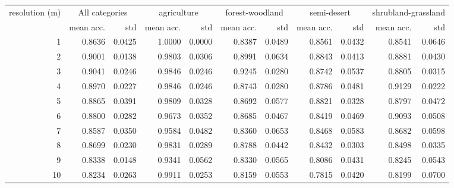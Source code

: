 \begin{tabular}{rrrrrrrrrrr}
\toprule
resolution (m) & \multicolumn{2}{c}{All categories} & \multicolumn{2}{c}{agriculture} & \multicolumn{2}{c}{forest-woodland} & \multicolumn{2}{c}{semi-desert} & \multicolumn{2}{c}{shrubland-grassland} \\
           &     mean acc. &    std &                 mean acc. &    std &                     mean acc. &    std &                 mean acc. &    std &                         mean acc. &    std \\
\midrule
         1 &   0.8636 & 0.0425 &               1.0000 & 0.0000 &                   0.8387 & 0.0489 &               0.8561 & 0.0432 &                       0.8541 & 0.0646 \\
         2 &   0.9001 & 0.0138 &               0.9803 & 0.0306 &                   0.8991 & 0.0634 &               0.8843 & 0.0413 &                       0.8881 & 0.0430 \\
         3 &   0.9041 & 0.0246 &               0.9846 & 0.0246 &                   0.9245 & 0.0280 &               0.8742 & 0.0537 &                       0.8805 & 0.0315 \\
         4 &   0.8970 & 0.0227 &               0.9846 & 0.0246 &                   0.8743 & 0.0280 &               0.8786 & 0.0481 &                       0.9129 & 0.0222 \\
         5 &   0.8865 & 0.0391 &               0.9809 & 0.0328 &                   0.8692 & 0.0577 &               0.8821 & 0.0328 &                       0.8797 & 0.0472 \\
         6 &   0.8800 & 0.0282 &               0.9673 & 0.0352 &                   0.8685 & 0.0467 &               0.8419 & 0.0469 &                       0.9093 & 0.0508 \\
         7 &   0.8587 & 0.0350 &               0.9584 & 0.0482 &                   0.8360 & 0.0653 &               0.8468 & 0.0583 &                       0.8682 & 0.0598 \\
         8 &   0.8699 & 0.0230 &               0.9831 & 0.0289 &                   0.8788 & 0.0442 &               0.8432 & 0.0303 &                       0.8498 & 0.0335 \\
         9 &   0.8338 & 0.0148 &               0.9341 & 0.0562 &                   0.8330 & 0.0565 &               0.8086 & 0.0431 &                       0.8245 & 0.0543 \\
        10 &   0.8234 & 0.0263 &               0.9911 & 0.0253 &                   0.8159 & 0.0553 &               0.7815 & 0.0420 &                       0.8199 & 0.0700 \\

\end{tabular}
